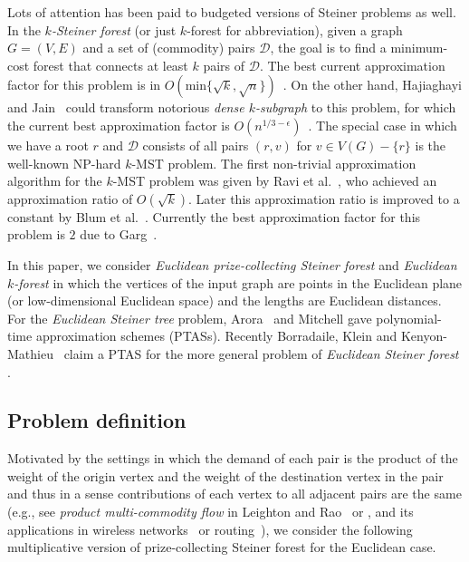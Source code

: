 \documentclass[extras,11pt]{article} \usepackage{fullpage}
\theoremstyle{mytheorem}
\newcommand{\prob}[1]{\textit{#1}}
\newcommand{\DD}{\mathcal{D}}
\begin{document}
Lots of attention has been paid to budgeted versions of Steiner problems
as well. In the \prob{$k$-Steiner forest} (or just $k$-forest for
abbreviation), given a graph $G=(V,E)$ and a set of (commodity)
pairs $\DD$, the goal is to find a minimum-cost forest that connects
at least $k$ pairs of $\DD$. The best current approximation factor
for this problem is in
$O(\text{min}\{\sqrt{k},\sqrt{n}\})$~\cite{GHNR07}. On the other
hand, Hajiaghayi and Jain~\cite{HJ06} could transform notorious
\prob{dense $k$-subgraph} to this problem, for which the current best
approximation factor is $O(n^{1/3-\epsilon})$~\cite{FKP01}. The
special case in which we have a root $r$ and $\DD$ consists of all
pairs $(r,v)$ for $v\in V(G)-\{r\}$ is the well-known NP-hard
$k$-MST problem. The first non-trivial approximation algorithm for
the $k$-MST problem was given by Ravi et al.~\cite{ch:18}, who
achieved an approximation ratio of $O(\sqrt k)$. Later this
approximation ratio is improved to a constant by Blum et
al.~\cite{ch:7}. Currently the best approximation factor for this
problem is $2$ due to Garg~\cite{ch:11}.

In this paper, we consider \prob{Euclidean prize-collecting Steiner
forest} and \prob{Euclidean $k$-forest} in which  the vertices of the input graph are
points in the Euclidean plane (or \iffalse in\fi low-dimensional Euclidean
space) and the lengths are Euclidean distances. For the \prob{Euclidean
Steiner tree} problem, Arora~\cite{arora98:ptas} and Mitchell
\cite{cr:26} gave polynomial-time approximation schemes (PTASs).
    Recently Borradaile, Klein and Kenyon-Mathieu~\cite{BKM08:euc-for} claim a PTAS for the
  more general problem of \prob{Euclidean Steiner forest} .







\subsection{Problem definition}


Motivated by the settings in which the demand of each pair is the
product of the weight of the origin vertex and the weight of the
destination vertex in the pair and thus in a sense contributions of
each vertex to all adjacent pairs are the same (e.g., see {\em
product multi-commodity flow} in Leighton and Rao~\cite{LR99} or \cite{Bonsma,KS02}, and
its applications in wireless networks~\cite{MSL08} or
routing~\cite{CKS04,CKS05}), we consider the following multiplicative
version of prize-collecting Steiner forest for the Euclidean case.
\end{document}

